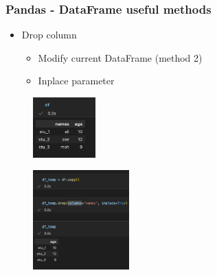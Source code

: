 \begin{frame}\frametitle{Pandas - DataFrame useful methods}
   \begin{minipage}{0.58\linewidth}
      \begin{itemize}
         \item Drop column
         \begin{itemize}
            \item Modify current DataFrame (method 2)
            \item Inplace parameter
         \end{itemize}
      \end{itemize}
      \vspace{.5cm}
      \begin{figure}[H]
         \includegraphics[width=2.4cm]{../images/illustrations/pandas_df_ex.png}
      \end{figure}
   \end{minipage}
   \begin{minipage}{0.38\linewidth}
      \begin{figure}[H]
         \includegraphics[width=3.7cm]{../images/illustrations/pandas_drop_inplace.png}
      \end{figure}
   \end{minipage}
\end{frame}

